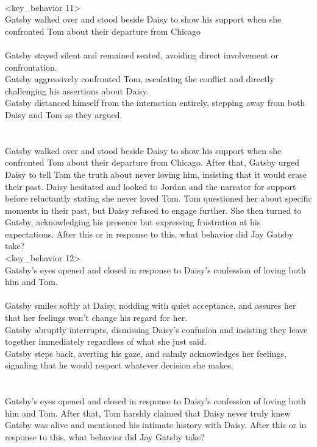 \begin{tcolorbox}[title = {Behavior Chain}, breakable]
\\<key\_behavior 11>\\
Gatsby walked over and stood beside Daisy to show his support when she confronted Tom about their departure from Chicago
\\<distracters 11>\\
Gatsby stayed silent and remained seated, avoiding direct involvement or confrontation.\\
Gatsby aggressively confronted Tom, escalating the conflict and directly challenging his assertions about Daisy.\\
Gatsby distanced himself from the interaction entirely, stepping away from both Daisy and Tom as they argued.\\
\\<context 12>\\
Gatsby walked over and stood beside Daisy to show his support when she confronted Tom about their departure from Chicago. After that, Gatsby urged Daisy to tell Tom the truth about never loving him, insisting that it would erase their past. Daisy hesitated and looked to Jordan and the narrator for support before reluctantly stating she never loved Tom. Tom questioned her about specific moments in their past, but Daisy refused to engage further. She then turned to Gatsby, acknowledging his presence but expressing frustration at his expectations. After this or in response to this, what behavior did Jay Gatsby take?
\\<key\_behavior 12>\\
Gatsby's eyes opened and closed in response to Daisy's confession of loving both him and Tom.
\\<distracters 12>\\
Gatsby smiles softly at Daisy, nodding with quiet acceptance, and assures her that her feelings won't change his regard for her.\\
Gatsby abruptly interrupts, dismissing Daisy's confusion and insisting they leave together immediately regardless of what she just said.\\
Gatsby steps back, averting his gaze, and calmly acknowledges her feelings, signaling that he would respect whatever decision she makes.\\
\\<context 13>\\
Gatsby's eyes opened and closed in response to Daisy's confession of loving both him and Tom. After that, Tom harshly claimed that Daisy never truly knew Gatsby was alive and mentioned his intimate history with Daisy. After this or in response to this, what behavior did Jay Gatsby take?

\end{tcolorbox}
